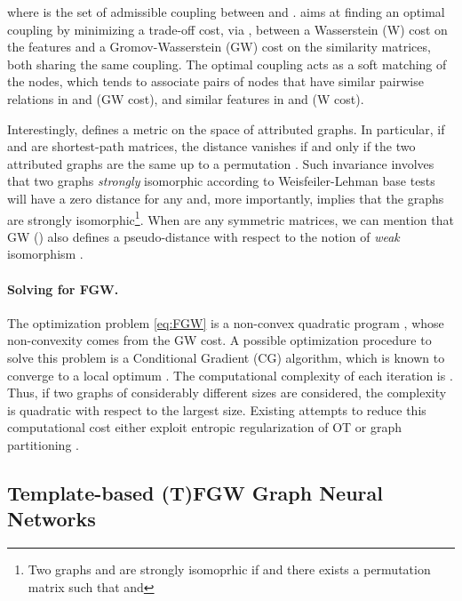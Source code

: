 \documentclass{article}
\begin{document}
where  is the set of admissible coupling between  and
.  aims at finding an optimal coupling  by minimizing a trade-off cost, via , between a Wasserstein (W)
cost on the features and a Gromov-Wasserstein (GW) cost on the similarity matrices, both sharing the same coupling. The
optimal coupling  acts as a soft matching of the nodes, which tends to
associate pairs of nodes that have similar pairwise relations in  and
 (GW cost), and similar features in  and 
(W cost). 

Interestingly,   defines a metric on the space of attributed graphs. In particular, if 
and  are shortest-path matrices, the  distance vanishes if and only if the two attributed graphs are the same up to a permutation \cite[Theorem 3.2]{titouan2019optimal}. 
Such invariance involves that two graphs \emph{strongly} isomorphic according to
Weisfeiler-Lehman base tests \cite{Leman2018THERO, Togninalli19} will have a zero  distance for any  and, more importantly,  implies that the graphs are strongly isomorphic\footnote{{Two graphs  and  are strongly isomoprhic if  and there exists a permutation matrix  such that  and }}.
When  are any symmetric matrices, we can mention
that GW () also defines a pseudo-distance \cite[Theorem
5.8]{sturm2012space} with respect to the notion of \emph{weak} isomorphism \cite{sturm2012space, chowdhury2021generalized}. 



\paragraph{Solving for FGW.}
The optimization problem \ref{eq:FGW} is a
non-convex quadratic program \cite[equation 6]{titouan2019optimal}, whose
non-convexity comes from the GW cost. A possible optimization procedure to solve this
problem is a Conditional Gradient (CG) algorithm, which is known to converge to a
local optimum \cite{lacoste-julien-convergence-2016}. The computational complexity of each iteration is  \cite{peyre2016gromov}. Thus, if two graphs of considerably different sizes are considered, the complexity is quadratic  with respect to the largest size. Existing attempts to reduce
this computational cost either exploit entropic regularization of OT
\cite{peyre2016gromov,scetbon2021lineartime} or graph partitioning \cite{xu2019scalable,chowdhury2021quantized}. 


\subsection{Template-based (T)FGW Graph Neural Networks \label{subsec:TFGW}} 
\end{document}
